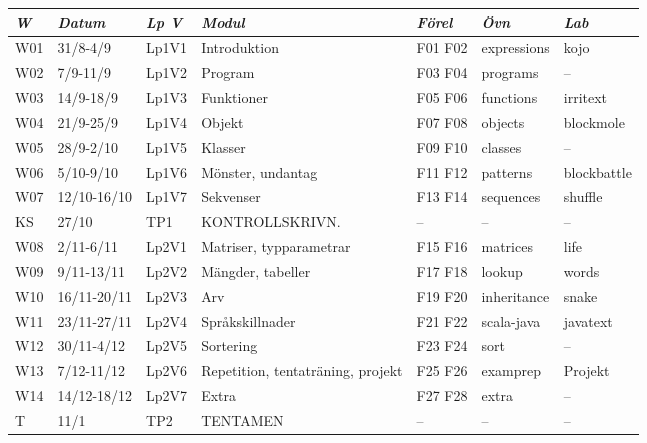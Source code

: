 \begin{tabular}{l|l|l|l|l|l|l}
\textit{W} & \textit{Datum} & \textit{Lp V} & \textit{Modul} & \textit{Förel} & \textit{Övn} & \textit{Lab} \\ \hline \hline
W01 & 31/8-4/9 & Lp1V1 & Introduktion & F01 F02 & expressions & kojo \\
W02 & 7/9-11/9 & Lp1V2 & Program & F03 F04 & programs & -- \\
W03 & 14/9-18/9 & Lp1V3 & Funktioner & F05 F06 & functions & irritext \\
W04 & 21/9-25/9 & Lp1V4 & Objekt & F07 F08 & objects & blockmole \\
W05 & 28/9-2/10 & Lp1V5 & Klasser & F09 F10 & classes & -- \\
W06 & 5/10-9/10 & Lp1V6 & Mönster, undantag & F11 F12 & patterns & blockbattle \\
W07 & 12/10-16/10 & Lp1V7 & Sekvenser & F13 F14 & sequences & shuffle \\
KS & 27/10 & TP1 & KONTROLLSKRIVN. & -- & -- & -- \\
W08 & 2/11-6/11 & Lp2V1 & Matriser, typparametrar & F15 F16 & matrices & life \\
W09 & 9/11-13/11 & Lp2V2 & Mängder, tabeller & F17 F18 & lookup & words \\
W10 & 16/11-20/11 & Lp2V3 & Arv & F19 F20 & inheritance & snake \\
W11 & 23/11-27/11 & Lp2V4 & Språkskillnader & F21 F22 & scala-java & javatext \\
W12 & 30/11-4/12 & Lp2V5 & Sortering & F23 F24 & sort & -- \\
W13 & 7/12-11/12 & Lp2V6 & Repetition, tentaträning, projekt & F25 F26 & examprep & Projekt \\
W14 & 14/12-18/12 & Lp2V7 & Extra & F27 F28 & extra & -- \\
T & 11/1 & TP2 & TENTAMEN & -- & -- & -- \\
\end{tabular}
